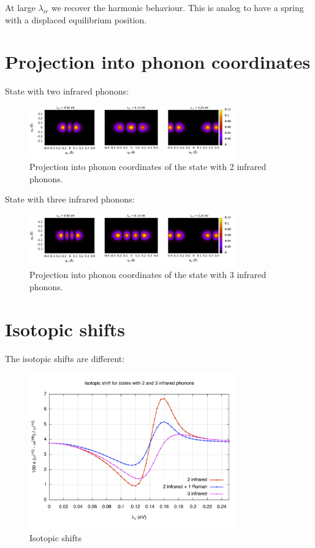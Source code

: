 At large $\lambda_{ir}$ we recover the harmonic behaviour. This is analog to have a spring with a displaced equilibrium position.

\section{Projection into phonon coordinates}

State with two infrared phonons:

\begin{figure}[ht!]
  \centering
  \includegraphics[width=0.8\textwidth]{images/ph-second_infrared.png}
  \caption{Projection into phonon coordinates of the state with 2 infrared phonons.}
  \label{fig:ph-second_infrared}
\end{figure}

State with three infrared phonons:

\begin{figure}[ht!]
  \centering
  \includegraphics[width=0.8\textwidth]{images/ph-third_infrared.png}
  \caption{Projection into phonon coordinates of the state with 3 infrared phonons.}
  \label{fig:ph-third_infrared}
\end{figure}

\section{Isotopic shifts}

The isotopic shifts are different:

\begin{figure}[ht!]
  \centering
  \includegraphics[width=0.8\textwidth]{images/isot-2_3ir.jpg}
  \caption{Isotopic shifts}
  \label{fig:isot-2_3ir}
\end{figure}
